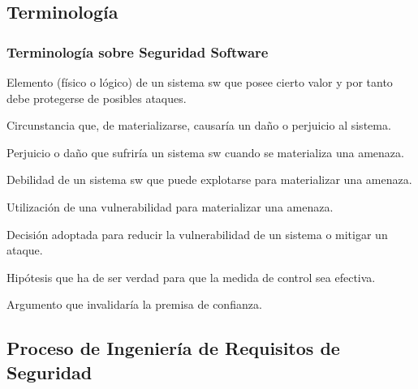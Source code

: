 \documentclass[handout,a4paper,slidestop,xcolor=pst,dvips,blue]{beamer}
\begin{document}
\subsection{Terminología}

\begin{frame}[c]
    \frametitle{Terminología sobre Seguridad Software}
    \begin{description}[<+->]
        \item[Activo] Elemento (físico o lógico) de un sistema sw que posee cierto valor y por tanto debe protegerse de posibles ataques.
        \item[Amenazas] Circunstancia que, de materializarse, causaría un daño o perjuicio al sistema.
        \item[Exposición] Perjuicio o daño que sufriría un sistema sw cuando se materializa una amenaza.
        \item[Vulnerabilidad] Debilidad de un sistema sw que puede explotarse para materializar una amenaza.
        \item[Ataque] Utilización de una vulnerabilidad para materializar una amenaza.
        \item[Medida de Control] Decisión adoptada para reducir la vulnerabilidad de un sistema o mitigar un ataque.
        \item[Premisa de Confianza] Hipótesis que ha de ser verdad para que la medida de control sea efectiva.
        \item[Contraargumento] Argumento que invalidaría la premisa de confianza.
    \end{description}
\end{frame}

\subsection{Proceso de Ingeniería de Requisitos de Seguridad}
\end{document}
